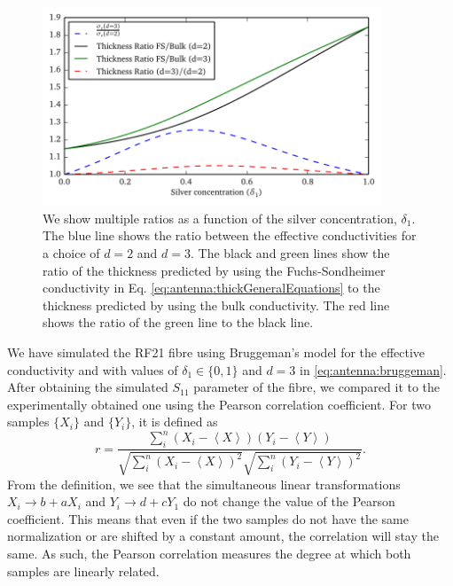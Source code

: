 \begin{figure}
  \centering
  \includegraphics[width=0.9\textwidth]{figs/active/comparisonThickness.pdf}
  \caption[Thickness ratios as a function of the silver concentration]
	  {We show multiple ratios as a function of the silver concentration,
	  $\delta_1$. The blue line shows the ratio between the effective
	  conductivities for a choice of $d=2$ and $d=3$. The black and 
	  green lines show the ratio of the thickness predicted by using
	  the Fuchs-Sondheimer conductivity in Eq. \eqref{eq:antenna:thickGeneralEquations}
	  to the thickness predicted by using the bulk conductivity.
	  The red line shows the ratio of the green line to the black line.}
  \label{fig:antenna.thicknessRatios}
\end{figure}

We have simulated the RF21 fibre using Bruggeman's model
for the effective conductivity and with values
of $\delta_1\in\{0,1\}$ and $d=3$ in \eqref{eq:antenna:bruggeman}.
After obtaining the simulated $S_\text{11}$ parameter of the fibre,
we compared it to the experimentally obtained one using the Pearson
correlation coefficient. For two samples $\{X_i\}$ and 
$\{Y_i\}$, it is defined as
  \begin{equation}
    r = \frac{\sum_i^n\left(X_i-\left\langle X\right\rangle\right)\left(Y_i-\left\langle Y\right\rangle\right)}
	     {\sqrt{\sum_i^n\left(X_i-\left\langle X\right\rangle\right)^2}\sqrt{\sum_i^n\left(Y_i-\left\langle Y\right\rangle\right)^2}}.
  \end{equation}
From the definition, we see that the simultaneous linear transformations $X_i\rightarrow b+aX_i$ and $Y_i\rightarrow d+cY_1$
do not change the value of the Pearson coefficient. This means that even if the two samples
do not have the same normalization or are shifted by a constant amount, the correlation 
will stay the same. As such, the Pearson correlation measures the degree at which 
both samples are linearly related. 

